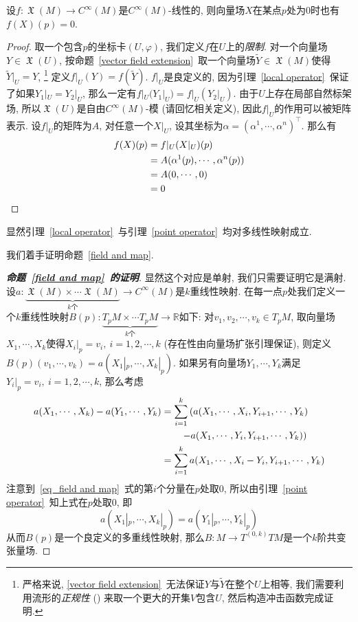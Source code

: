 \begin{lem}\label{point operator}
    设$f:\mfrakX(M)\to C^\infty(M)$是$C^\infty(M)$-线性的, 则向量场$X$在某点$p$处为$0$时也有$f(X)(p)=0$.
\end{lem}
\begin{proof}
    取一个包含$p$的坐标卡$(U,\varphi)$, 我们定义$f$在$U$上的\textit{限制}.
    对一个向量场$Y\in\mfrakX(U)$, 按命题~\ref{vector field extension}~取一个向量场$\widetilde{Y}\in\mfrakX(M)$使得$\widetilde{Y}|_U=Y$,
    \footnote{严格来说, \ref{vector field extension}~无法保证$Y$与$\widetilde{Y}$在整个$U$上相等, 我们需要利用流形的\textit{正规性} (\Parencite[定理4.81]{Lee_IntroTopoMani}) 来取一个更大的开集$V$包含$U$, 然后构造冲击函数完成证明.}
    定义$f|_U(Y)=f(\widetilde{Y})$.
    $f|_U$是良定义的, 因为引理~\ref{local operator}~保证了如果$Y_1|_U=Y_2|_U$, 那么一定有$f|_U(Y_1|_U)=f|_U(Y_2|_U)$.
    由于$U$上存在局部自然标架场, 所以$\mfrakX(U)$是自由$C^\infty(M)$-模 (请回忆相关定义),
    因此$f|_U$的作用可以被矩阵表示.
    设$f|_U$的矩阵为$A$, 对任意一个$X|_U$, 设其坐标为$\alpha=(\alpha^1,\cdots,\alpha^n)^\top$.
    那么有
    \begin{align}
        f(X)(p)&=f|_U(X|_U)(p)\\
        &=A(\alpha^1(p),\cdots,\alpha^n(p))\\
        &=A(0,\cdots,0)\\
        &=0\qedhere
    \end{align}
\end{proof}

\begin{col}
    显然引理~\ref{local operator}~与引理~\ref{point operator}~均对多线性映射成立.
\end{col}

我们着手证明命题~\ref{field and map}.
\begin{proof}[{\bf 命题~\ref{field and map}~的证明}]
    显然这个对应是单射, 我们只需要证明它是满射.
    设$a:\underbrace{\mfrakX(M)\times\cdots\mfrakX(M)}_{k\text{个}}\to C^\infty(M)$是$k$重线性映射.
    在每一点$p$处我们定义一个$k$重线性映射$B(p):\underbrace{T_pM\times\cdots T_pM}_{k\text{个}}\to\mathbb{R}$如下:
    对$v_1,v_2,\cdots,v_k\in T_pM$, 取向量场$X_1,\cdots,X_k$使得$X_i|_p=v_i,\ i=1,2,\cdots,k$ (存在性由向量场扩张引理保证),
    则定义$B(p)(v_1,\cdots,v_k)=a(X_1|_p,\cdots,X_k|_p)$.
    如果另有向量场$Y_1,\cdots,Y_k$满足$Y_i|_p=v_i,\ i=1,2,\cdots,k$, 那么考虑
    \begin{align}
        a(X_1,\cdots,X_k)-a(Y_1,\cdots,Y_k)&=\sum_{i=1}^k\left(a(X_1,\cdots,X_i,Y_{i+1},\cdots,Y_k)\right.\notag\\
        &\qquad\left.-a(X_1,\cdots,Y_i,Y_{i+1},\cdots,Y_k)\right)\notag\\
        &=\sum_{i=1}^ka(X_1,\cdots,X_i-Y_i,Y_{i+1},\cdots,Y_k)\label{eq_field and map}
    \end{align}
    注意到~\eqref{eq_field and map}~式的第$i$个分量在$p$处取$0$, 所以由引理~\ref{point operator}~知上式在$p$处取$0$, 即
    \[a(X_1|_p,\cdots,X_k|_p)=a(Y_1|_p,\cdots,Y_k|_p)\]
    从而$B(p)$是一个良定义的多重线性映射, 那么$B:M\to T^{(0,k)}TM$是一个$k$阶共变张量场.
\end{proof}

